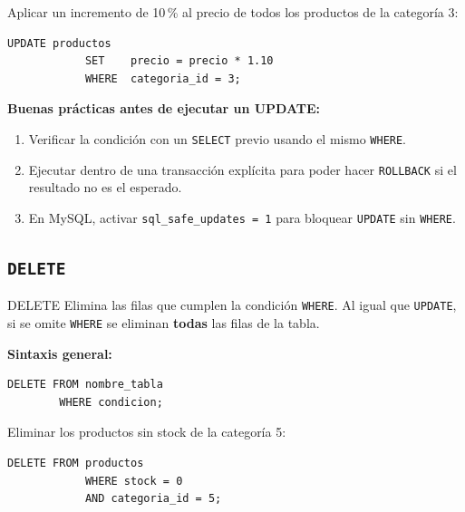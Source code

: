 \documentclass[12pt, a4paper]{article}
\begin{document}
	\begin{ejemplo}
		Aplicar un incremento de 10\,\% al precio de todos los productos de la
		categoría 3:
		
		\begin{lstlisting}[style=sql, caption={UPDATE con expresión aritmética}]
			UPDATE productos
			SET    precio = precio * 1.10
			WHERE  categoria_id = 3;
		\end{lstlisting}
	\end{ejemplo}
	
	\begin{nota}
		\textbf{Buenas prácticas antes de ejecutar un UPDATE:}
		\begin{enumerate}
			\item Verificar la condición con un \texttt{SELECT} previo usando el mismo
			\texttt{WHERE}.
			\item Ejecutar dentro de una transacción explícita para poder hacer
			\texttt{ROLLBACK} si el resultado no es el esperado.
			\item En MySQL, activar \texttt{sql\_safe\_updates = 1} para bloquear
			\texttt{UPDATE} sin \texttt{WHERE}.
		\end{enumerate}
	\end{nota}
	
	\subsection{\texttt{DELETE}}
	
	\begin{definicion}{DELETE}
		Elimina las filas que cumplen la condición \texttt{WHERE}. Al igual que
		\texttt{UPDATE}, si se omite \texttt{WHERE} se eliminan \textbf{todas} las
		filas de la tabla.
	\end{definicion}
	
	\textbf{Sintaxis general:}
	
	\begin{lstlisting}[style=sql, caption={Sintaxis de DELETE con WHERE}]
		DELETE FROM nombre_tabla
		WHERE condicion;
	\end{lstlisting}
	
	\begin{ejemplo}
		Eliminar los productos sin stock de la categoría 5:
		
		\begin{lstlisting}[style=sql, caption={DELETE con condición compuesta}]
			DELETE FROM productos
			WHERE stock = 0
			AND categoria_id = 5;
		\end{lstlisting}
	\end{ejemplo}
	
\end{document}
